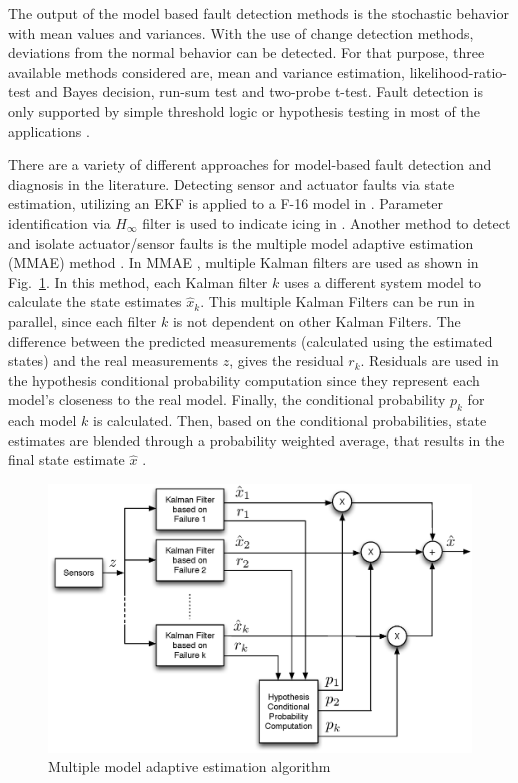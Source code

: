The output of the model based fault detection methods is the stochastic behavior 
with mean values and variances. With the use of change detection methods, deviations 
from the normal behavior can be detected. For that purpose, three available methods 
considered are, mean and variance estimation, likelihood-ratio-test and Bayes decision, 
run-sum test and two-probe t-test. Fault detection is only supported by simple threshold 
logic or hypothesis testing in most of the applications \cite{isermann1997trends}.

There are a variety of different approaches for model-based fault detection and diagnosis in the literature.
Detecting sensor and actuator faults via state estimation, utilizing an EKF is applied to a 
F-16 model in \cite{hajiyev2005sensor}. Parameter identification via $H_{\infty}$ filter 
is used to indicate icing in \cite{melody2001h}.
Another method to detect and isolate actuator/sensor faults is the multiple model adaptive estimation (MMAE) method \cite{ducard2009fault}. In MMAE \cite{magill1965optimal}, multiple Kalman filters are used as shown in Fig.~\ref{fig:mmaeScheme}. In this method, each Kalman filter $k$ uses a different system model to calculate the state estimates $\hat{x}_k$. This multiple Kalman Filters can be run in parallel, since each filter $k$ is not dependent on other Kalman Filters. The difference between the predicted measurements (calculated using the estimated states) and the real measurements $z$, gives the residual $r_k$. Residuals are used in the hypothesis conditional probability computation since they represent each model's closeness to the real model. Finally, the conditional probability $p_k$ for each model $k$ is calculated. Then, based on the conditional probabilities, state estimates are blended through a probability weighted average, that results in the final state estimate  $\hat{x}$ \cite{miller1998modified}.

\begin{figure}
\begin{center}
\includegraphics[width=14.7cm]{figures/mmaeScheme}
\caption{Multiple model adaptive estimation algorithm \cite{miller1998modified}} 
\label{fig:mmaeScheme}
\end{center}
\end{figure}

